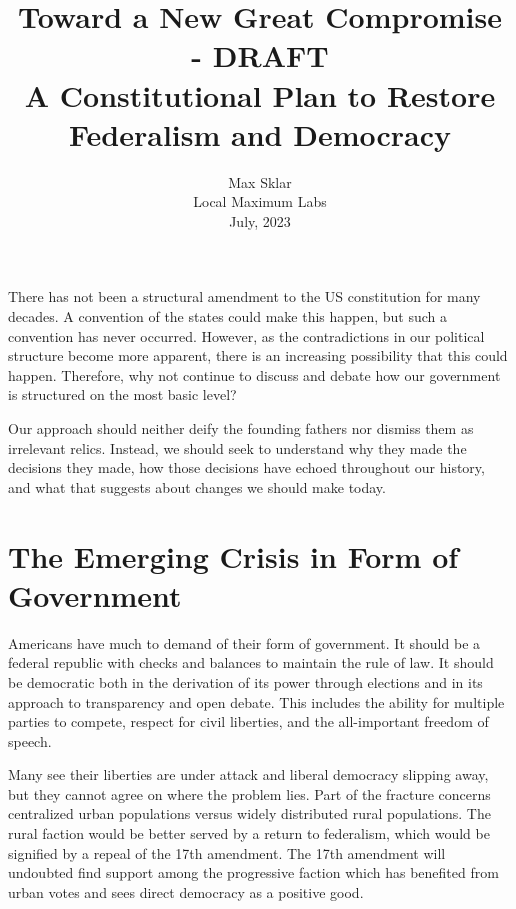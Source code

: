 \documentclass{article}
\begin{document}
\parindent=0in
\parskip=12pt

\title{
  Toward a New Great Compromise - DRAFT\\
  \large{
    A Constitutional Plan to Restore Federalism and Democracy
  }
}

\author{Max Sklar\\ Local Maximum Labs \\ July, 2023}
\date{}

\maketitle
\thispagestyle{empty}

There has not been a structural amendment to the US constitution for many decades. A convention of the states could make this happen, but such a convention has never occurred. However, as the contradictions in our political structure become more apparent, there is an increasing possibility that this could happen. Therefore, why not continue to discuss and debate how our government is structured on the most basic level?

Our approach should neither deify the founding fathers nor dismiss them as irrelevant relics. Instead, we should seek to understand why they made the decisions they made, how those decisions have echoed throughout our history, and what that suggests about changes we should make today.

\section{The Emerging Crisis in Form of Government}

Americans have much to demand of their form of government. It should be a federal republic with checks and balances to maintain the rule of law. It should be democratic both in the derivation of its power through elections and in its approach to transparency and open debate. This includes the ability for multiple parties to compete, respect for civil liberties, and the all-important freedom of speech.

Many see their liberties are under attack and liberal democracy slipping away, but they cannot agree on where the problem lies. Part of the fracture concerns centralized urban populations versus widely distributed rural populations. The rural faction would be better served by a return to federalism, which would be signified by a repeal of the 17th amendment\cite{Tucker}\cite{Virginia}. The 17th amendment will undoubted find support among the progressive faction which has benefited from urban votes and sees direct democracy as a positive good\cite{Smith}.
\end{document}
